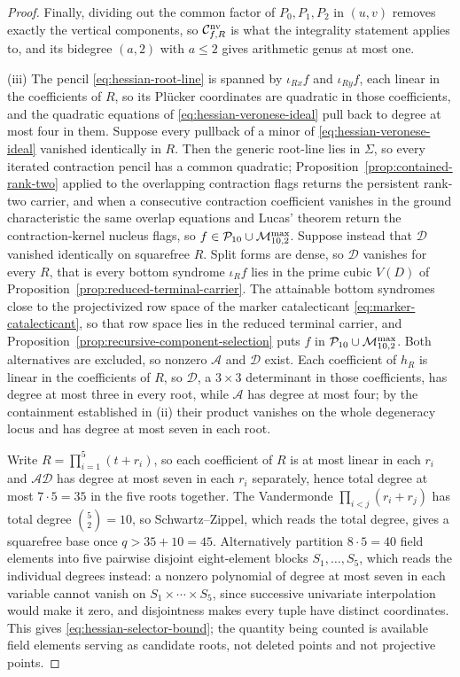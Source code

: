 \begin{proof}
Finally, dividing out the common factor of $P_0,P_1,P_2$ in $(u,v)$ removes
exactly the vertical components, so $\mathcal C^{\mathrm{nv}}_{f,R}$ is what the
integrality statement applies to, and its bidegree $(a,2)$ with $a\leq2$ gives
arithmetic genus at most one.

(iii)  The pencil \eqref{eq:hessian-root-line} is spanned by
$\iota_{Rx}f$ and $\iota_{Ry}f$, each linear in the coefficients of $R$,
so its Pl\"ucker coordinates are quadratic in those coefficients, and the
quadratic equations of \eqref{eq:hessian-veronese-ideal} pull back to degree at
most four in them.  Suppose every pullback of a minor of
\eqref{eq:hessian-veronese-ideal} vanished identically in $R$.  Then the
generic root-line lies in $\Sigma$, so every iterated contraction pencil has a
common quadratic; Proposition~\ref{prop:contained-rank-two} applied to the
overlapping contraction flags returns the persistent rank-two carrier, and
when a consecutive contraction coefficient vanishes in the ground
characteristic the same overlap equations and Lucas' theorem return the
contraction-kernel nucleus flags, so $f\in\mathcal P_{10}\cup\mathcal M^{\max}_{10,2}$.
Suppose instead that $\mathcal D$ vanished identically on squarefree $R$.  Split forms
are dense, so $\mathcal D$ vanishes for every $R$, that is every bottom
syndrome $\iota_Rf$ lies in the prime cubic $V(D)$ of
Proposition~\ref{prop:reduced-terminal-carrier}.  The attainable bottom
syndromes close to the projectivized row space of the marker catalecticant
\eqref{eq:marker-catalecticant}, so that row space lies in the reduced terminal
carrier, and Proposition~\ref{prop:recursive-component-selection} puts $f$ in
$\mathcal P_{10}\cup\mathcal M^{\max}_{10,2}$.  Both alternatives are excluded, so
nonzero $\mathcal A$ and $\mathcal D$ exist.  Each coefficient of
$h_R$ is linear in the coefficients of $R$, so $\mathcal D$, a $3\times3$
determinant in those coefficients, has degree at most three in every root,
while $\mathcal A$ has degree at most four; by the containment established in
(ii) their product vanishes on the whole degeneracy locus and has degree at
most seven in each root.

Write $R=\prod_{i=1}^5(t+r_i)$, so each coefficient of $R$ is at most linear in
each $r_i$ and $\mathcal{AD}$ has degree at most seven in each $r_i$
separately, hence total degree at most $7\cdot5=35$ in the five roots
together.  The
Vandermonde $\prod_{i<j}(r_i+r_j)$ has total degree $\binom52=10$, so
Schwartz--Zippel, which reads the total degree, gives a squarefree base once
$q>35+10=45$.  Alternatively
partition $8\cdot5=40$ field elements into five pairwise disjoint
eight-element blocks $S_1,\ldots,S_5$, which reads the individual degrees
instead: a nonzero polynomial of degree at most
seven in each
variable cannot vanish on $S_1\times\cdots\times S_5$, since successive
univariate interpolation would make it zero, and disjointness makes every tuple
have distinct coordinates.  This gives
\eqref{eq:hessian-selector-bound}; the quantity being counted is available
field elements serving as candidate roots, not deleted points and not
projective points.


\end{proof}
